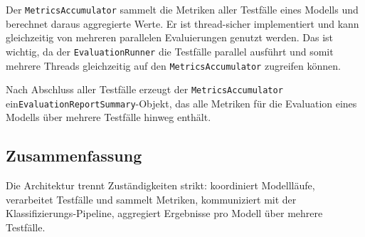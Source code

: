 Der \texttt{MetricsAccumulator} sammelt die Metriken aller Testfälle eines Modells und berechnet daraus aggregierte Werte. Er ist thread-sicher implementiert und kann gleichzeitig von mehreren parallelen Evaluierungen genutzt werden. Das ist wichtig, da der \texttt{EvaluationRunner} die Testfälle parallel ausführt und somit mehrere Threads gleichzeitig auf den \texttt{MetricsAccumulator} zugreifen können.

Nach Abschluss aller Testfälle erzeugt der \texttt{MetricsAccumulator} ein\break \texttt{EvaluationReportSummary}-Objekt, das alle Metriken für die Evaluation eines Modells über mehrere Testfälle hinweg enthält.

\subsection*{Zusammenfassung}

Die Architektur trennt Zuständigkeiten strikt:
 koordiniert Modellläufe,
 verarbeitet Testfälle und sammelt Metriken,
 kommuniziert mit der Klassifizierungs-Pipeline,
 aggregiert Ergebnisse pro Modell über mehrere Testfälle.
